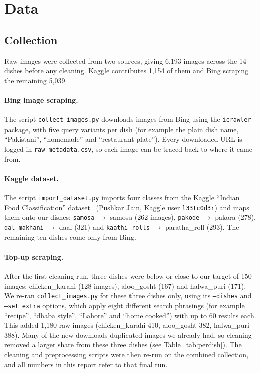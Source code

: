 \section{Data}

\subsection{Collection}
Raw images were collected from two sources, giving 6,193 images across the 14 dishes before any cleaning. Kaggle contributes 1,154 of them and Bing scraping the remaining 5,039.

\paragraph{Bing image scraping.} The script \texttt{collect\_images.py} downloads images from Bing using the \texttt{icrawler} package, with five query variants per dish (for example the plain dish name, ``Pakistani'', ``homemade'' and ``restaurant plate''). Every downloaded URL is logged in \texttt{raw\_metadata.csv}, so each image can be traced back to where it came from.

\paragraph{Kaggle dataset.} The script \texttt{import\_dataset.py} imports four classes from the Kaggle ``Indian Food Classification'' dataset~\cite{jain_indian_food_kaggle} (Pushkar Jain, Kaggle user \texttt{l33tc0d3r}) and maps them onto our dishes: \texttt{samosa} $\rightarrow$ samosa (262 images), \texttt{pakode} $\rightarrow$ pakora (278), \texttt{dal\_makhani} $\rightarrow$ daal (321) and \texttt{kaathi\_rolls} $\rightarrow$ paratha\_roll (293). The remaining ten dishes come only from Bing.

\paragraph{Top-up scraping.} After the first cleaning run, three dishes were below or close to our target of 150 images: chicken\_karahi (128 images), aloo\_gosht (167) and halwa\_puri (171). We re-ran \texttt{collect\_images.py} for these three dishes only, using its \texttt{--dishes} and \texttt{--set extra} options, which apply eight different search phrasings (for example ``recipe'', ``dhaba style'', ``Lahore'' and ``home cooked'') with up to 60 results each. This added 1,180 raw images (chicken\_karahi 410, aloo\_gosht 382, halwa\_puri 388). Many of the new downloads duplicated images we already had, so cleaning removed a larger share from these three dishes (see Table~\ref{tab:perdish}). The cleaning and preprocessing scripts were then re-run on the combined collection, and all numbers in this report refer to that final run.


